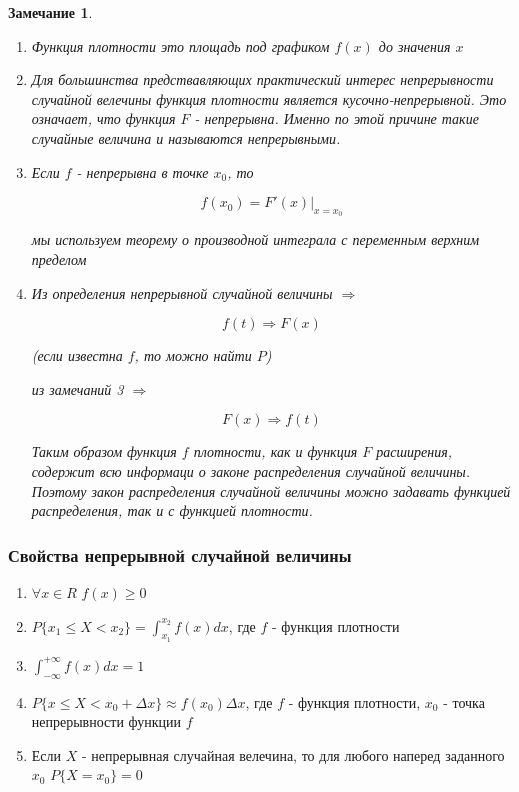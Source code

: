 \documentclass[a4paper, 14pt]{report}
\newtheorem{note}{Замечание}[section]
\begin{document}
\begin{note}
    \begin{enumerate}
        \item Функция плотности это площадь под графиком $f(x)$ до значения $x$
        \item Для большинства предствавляющих практический интерес непрерывности случайной велечины функция плотности является кусочно-непрерывной. Это означает, что функция $F$ - непрерывна. Именно по этой причине такие случайные величина и называются непрерывными.
        \item Если $f$ - непрерывна в точке $x_0$, то 

            $$
            f(x_0) = F'(x) |_{x=x_0}
            $$

            мы используем теорему о производной интеграла с переменным верхним пределом

        \item Из определения непрерывной случайной величины $\Rightarrow$

            $$
            f(t) \Rightarrow F(x)
            $$

            (если известна $f$, то можно найти $P$)

            из замечаний 3 $\Rightarrow$ 

            $$
            F(x) \Rightarrow f(t)
            $$

            Таким образом функция $f$ плотности, как и функция $F$ расширения, содержит всю информаци о законе распределения случайной величины. Поэтому закон распределения случайной величины можно задавать функцией распределения, так и с функцией плотности.
    \end{enumerate}
\end{note}

\subsubsection{Свойства непрерывной случайной величины}

\begin{enumerate}
    \item $\forall x \in R$ $f(x) \geq 0$
    \item $P\{x_1 \le X < x_2 \} = \int_{x_1}^{x_2} f(x) dx$, где $f$ - функция плотности
    \item $\int_{-\infty}^{+\infty} f(x)dx = 1$
    \item $P\{x \le X < x_0 + \Delta x\} \approx f(x_0) \Delta x$, где $f$ - функция плотности, $x_0$ - точка непрерывности функции $f$
    \item Если $X$ - непрерывная случайная велечина, то для любого наперед заданного $x_0$
        $P\{X = x_0\} = 0$
\end{enumerate}
\end{document}
